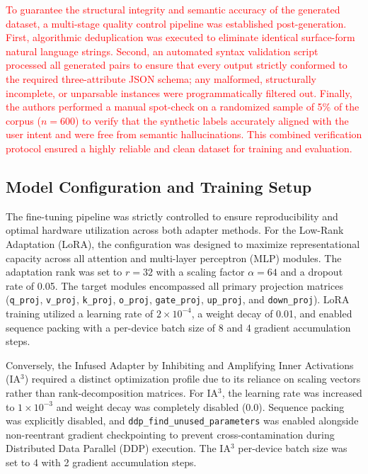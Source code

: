 \documentclass[journal,article,submit,pdftex,moreauthors]{Definitions/mdpi}
\begin{document}
\textcolor{red}{To guarantee the structural integrity and semantic accuracy of the generated dataset, a multi-stage quality control pipeline was established post-generation. First, algorithmic deduplication was executed to eliminate identical surface-form natural language strings. Second, an automated syntax validation script processed all generated pairs to ensure that every output strictly conformed to the required three-attribute JSON schema; any malformed, structurally incomplete, or unparsable instances were programmatically filtered out. Finally, the authors performed a manual spot-check on a randomized sample of 5\% of the corpus ($n = 600$) to verify that the synthetic labels accurately aligned with the user intent and were free from semantic hallucinations. This combined verification protocol ensured a highly reliable and clean dataset for training and evaluation.}

\subsection{Model Configuration and Training Setup}

The fine-tuning pipeline was strictly controlled to ensure reproducibility and optimal hardware utilization across both adapter methods. For the Low-Rank Adaptation (LoRA), the configuration was designed to maximize representational capacity across all attention and multi-layer perceptron (MLP) modules. The adaptation rank was set to $r=32$ with a scaling factor $\alpha=64$ and a dropout rate of 0.05. The target modules encompassed all primary projection matrices (\texttt{q\_proj}, \texttt{v\_proj}, \texttt{k\_proj}, \texttt{o\_proj}, \texttt{gate\_proj}, \texttt{up\_proj}, and \texttt{down\_proj}). LoRA training utilized a learning rate of $2 \times 10^{-4}$, a weight decay of 0.01, and enabled sequence packing with a per-device batch size of 8 and 4 gradient accumulation steps.

Conversely, the Infused Adapter by Inhibiting and Amplifying Inner Activations (IA$^3$) required a distinct optimization profile due to its reliance on scaling vectors rather than rank-decomposition matrices. For IA$^3$, the learning rate was increased to $1 \times 10^{-3}$ and weight decay was completely disabled ($0.0$). Sequence packing was explicitly disabled, and \texttt{ddp\_find\_unused\_parameters} was enabled alongside non-reentrant gradient checkpointing to prevent cross-contamination during Distributed Data Parallel (DDP) execution. The IA$^3$ per-device batch size was set to 4 with 2 gradient accumulation steps.
\end{document}
